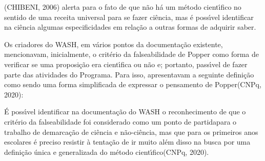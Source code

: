 \documentclass[
12pt,		%
openright,	%
twoside,  %
a4paper,			%
chapter=TITLE,		%
english,			%
french,				%
spanish,			%
brazil				%
]{USPSC-classe/USPSC}
\begin{document}
(CHIBENI, 2006) alerta para o fato de que \textquotedbl n\~ao h\'a um m\'etodo cient\'{\i}fico no sentido de uma receita universal para se fazer ci\^encia\textquotedbl , mas \'e poss\'{\i}vel identificar na ci\^encia algumas especificidades em rela\c{c}\~ao a outras formas de adquirir saber.

















Os criadores do WASH, em v\'arios pontos da documenta\c{c}\~ao existente, mencionavam, inicialmente, o crit\'erio da falseabilidade de Popper como forma de verificar se uma proposi\c{c}\~ao era cient\'{\i}fica ou n\~ao e; portanto, pass\'{\i}vel de fazer parte das atividades do Programa. Para isso, apresentavam a seguinte defini\c{c}\~ao como sendo uma \textquotedbl forma simplificada de expressar o pensamento de Popper\textquotedbl  (CNPq, 2020):


















\noindent\begin{center}\mbox{\centering{}}\end{center}


\'E poss\'{\i}vel identificar na documenta\c{c}\~ao do WASH o reconhecimento de que o crit\'erio da falseabilidade foi considerado como um \textquotedbl ponto de partida\textquotedbl  para o trabalho de \textquotedbl demarca\c{c}\~ao de ci\^encia e n\~ao-ci\^encia\textquotedbl , mas que para \textquotedbl os primeiros anos escolares \'e preciso resistir \`a tenta\c{c}\~ao de ir muito al\'em disso na busca por uma defini\c{c}\~ao \'unica e generalizada do m\'etodo cient\'{\i}fico\textquotedbl  (CNPq, 2020).
\end{document}
